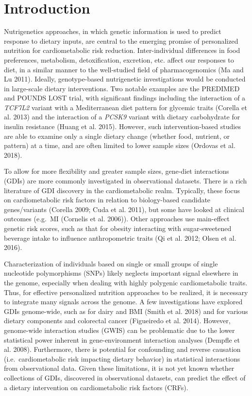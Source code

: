 \documentclass[]{article}
\begin{document}
\hypertarget{introduction}{%
\section{Introduction}\label{introduction}}

Nutrigenetics approaches, in which genetic information is used to
predict response to dietary inputs, are central to the emerging promise
of personalized nutrition for cardiometabolic risk reduction.
Inter-individual differences in food preferences, metabolism,
detoxification, excretion, etc. affect our responses to diet, in a
similar manner to the well-studied field of pharmacogenomics (Ma and Lu
2011). Ideally, genotype-based nutrigenetic investigations would be
conducted in large-scale dietary interventions. Two notable examples are
the PREDIMED and POUNDS LOST trial, with significant findings including
the interaction of a \emph{TCF7L2} variant with a Mediterranean diet
pattern for glycemic traits (Corella et al. 2013) and the interaction of
a \emph{PCSK9} variant with dietary carbohydrate for insulin resistance
(Huang et al. 2015). However, such intervention-based studies are able
to examine only a single dietary change (whether food, nutrient, or
pattern) at a time, and are often limited to lower sample sizes (Ordovas
et al. 2018).

To allow for more flexibility and greater sample sizes, gene-diet
interactions (GDIs) are more commonly investigated in observational
datasets. There is a rich literature of GDI discovery in the
cardiometabolic realm. Typically, these focus on cardiometabolic risk
factors in relation to biology-based candidate genes/variants (Corella
2009; Cuda et al. 2011), but some have looked at clinical outcomes
(e.g.~MI (Cornelis et al. 2006)). Other approaches use main-effect
genetic risk scores, such as that for obesity interacting with
sugar-sweetened beverage intake to influence anthropometric traits (Qi
et al. 2012; Olsen et al. 2016).

Characterization of individuals based on single or small groups of
single nucleotide polymorphisms (SNPs) likely neglects important signal
elsewhere in the genome, especially when dealing with highly polygenic
cardiometabolic traits. Thus, for effective personalized nutrition
approaches to be realized, it is necessary to integrate many signals
across the genome. A few investigations have explored GDIs genome-wide,
such as for dairy and BMI (Smith et al. 2018) and for various dietary
components and colorectal cancer (Figueiredo et al. 2014). However,
genome-wide interaction studies (GWIS) can be problematic due to the
lower statistical power inherent in gene-environment interaction
analyses (Dempfle et al. 2008). Furthermore, there is potential for
confounding and reverse causation (i.e.~cardiometabolic risk impacting
dietary behavior) in statistical interactions from observational data.
Given these limitations, it is not yet known whether collections of
GDIs, discovered in observational datasets, can predict the effect of a
dietary intervention on cardiometabolic risk factors (CRFs).
\end{document}
